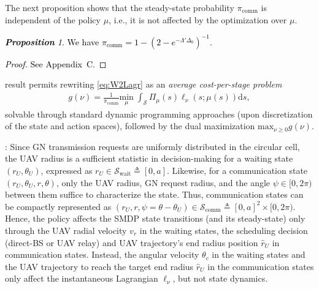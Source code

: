 \documentclass[12pt, draftcls, onecolumn]{IEEEtran}
\theoremstyle{plain}
\theoremstyle{definition}
\theoremstyle{remark}
\newtheorem{prop}{\textbf{Proposition}}
\newcommand\hlt[1]{\textcolor{black}{#1}}
\begin{document}
The next proposition shows that the steady-state probability $\pi_{\mathrm{comm}}$ is independent of the policy $\mu$, i.e., it is not affected by the optimization over $\mu$.
\hlt{\begin{prop}\label{P3}
We have
$\pi_{\mathrm{comm}}{=}1-(2{-}e^{-\Lambda'\Delta_{0}})^{-1}$.
\end{prop}
\begin{proof}    See Appendix~C.\end{proof}
}
 result permits rewriting \eqref{eq:W2Lagr} as an \emph{average cost-per-stage problem}
\begin{align}\label{eq:TotalGMin}
	g(\nu) = \frac{1}{\pi_{\mathrm{comm}}}\underset{\mu}{\mathrm{min}} \; \int_{\mathcal{S}} \Pi_{\mu}(s) \ell_\nu(s; \mu(s))\mathrm d s,
\end{align}
solvable through standard dynamic programming approaches (upon discretization of the state and action spaces), followed by the dual maximization $\mathrm{max}_{\nu{\geq}0}g(\nu)$.

: Since GN transmission requests are uniformly distributed in the circular cell, the UAV radius is a sufficient statistic in decision-making for a waiting state $(r_{U},\theta_{U})$, expressed as $r_{U}{\in}\mathcal{S}_{\mathrm{wait}}\triangleq[0,a]$. Likewise, for a communication state $(r_{U},\theta_{U},r,\theta)$, only the UAV radius, GN request radius, and the angle $\psi{\in}[0,2\pi)$ between them suffice to characterize the state. Thus, communication states can be compactly represented as $(r_{U},r,\psi{=}\theta{-}\theta_U){\in}\mathcal{S}_{\mathrm{comm}}\triangleq[0,a]^2{\times}[0, 2\pi)$. Hence, the policy affects the SMDP state transitions (and its steady-state) only through the UAV radial velocity $v_{r}$ in the waiting states, the
scheduling decision (direct-BS or UAV relay) and
 UAV trajectory's end radius position $\hat{r}_{U}$ in communication states. Instead, the angular velocity $\theta_{c}$ in the waiting states and the UAV trajectory to reach the target end radius $\hat{r}_{U}$ in the communication states
  only affect the instantaneous Lagrangian $\ell_{\nu}$, but not
 state dynamics.
\end{document}
